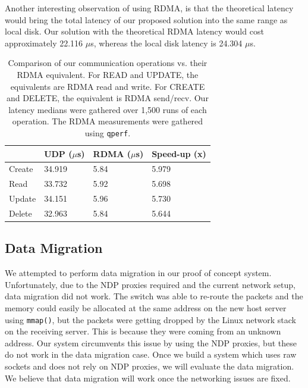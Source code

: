 Another interesting observation of using RDMA, is that the theoretical latency would bring the total latency of our proposed solution into the same range as local disk. Our solution with the theoretical RDMA latency would cost approximately 22.116 $\mu$s, whereas the local disk latency is 24.304 $\mu$s.

\begin{table}[t]
    \begin{tabular}{ | l | l | l | l | }
        \hline
        & UDP ($\mu$s) & RDMA ($\mu$s) & Speed-up (x) \\ 
        \hline\hline
        Create & 34.919 & 5.84 & 5.979\\
        \hline
        Read & 33.732 & 5.92 & 5.698\\  
        \hline
        Update & 34.151 & 5.96 & 5.730\\
        \hline
        Delete & 32.963 & 5.84 & 5.644\\
        \hline
    \end{tabular}
    \caption{Comparison of our communication operations vs. their RDMA equivalent. For READ and UPDATE, the equivalents are RDMA read and write. For CREATE and DELETE, the equivalent is RDMA send/recv. Our latency medians were gathered over 1,500 runs of each operation. The RDMA measurements were gathered using \texttt{qperf}.}
    \label{table:rdma_compare}
\end{table}



\subsection{Data Migration}
We attempted to perform data migration in our proof of concept system. Unfortunately, due to the NDP proxies required and the current network setup, data migration did not work. The switch was able to re-route the packets and the memory could easily be allocated at the same address on the new host server using \texttt{mmap()}, but the packets were getting dropped by the Linux network stack on the receiving server. This is because they were coming from an unknown address. Our system circumvents this issue by using the NDP proxies, but these do not work in the data migration case. Once we build a system which uses raw sockets and does not rely on NDP proxies, we will evaluate the data migration. We believe that data migration will work once the networking issues are fixed. 

